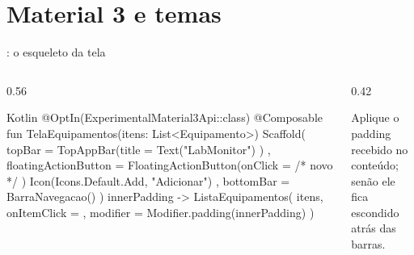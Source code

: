 \documentclass[aspectratio=169,10pt]{beamer}
\begin{document}
\section{Material 3 e temas}

\begin{frame}[fragile]{: o esqueleto da tela}
  \begin{columns}[T]
    \begin{column}{0.56\textwidth}
\begin{codigo}[title=TelaEquipamentos.kt]{Kotlin}
@OptIn(ExperimentalMaterial3Api::class)
@Composable
fun TelaEquipamentos(itens: List<Equipamento>) {
  Scaffold(
    topBar = {
      TopAppBar(title = { Text("LabMonitor") })
    },
    floatingActionButton = {
      FloatingActionButton(onClick = { /* novo */ }) {
        Icon(Icons.Default.Add, "Adicionar")
      }
    },
    bottomBar = { BarraNavegacao() }
  ) { innerPadding ->
    ListaEquipamentos(
      itens,
      onItemClick = {},
      modifier = Modifier.padding(innerPadding)
    )
  }
}
\end{codigo}
    \end{column}
    \begin{column}{0.42\textwidth}
      \centering
      \begin{atencao}
        Aplique o padding recebido no conteúdo; senão ele fica escondido atrás das barras.
      \end{atencao}
    \end{column}
  \end{columns}
\end{frame}
\end{document}
